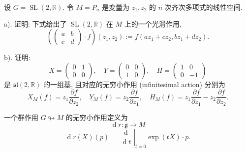 \documentclass[../main.tex]{subfiles}
\begin{document}
\begin{exercise}{}{}
设 $G=\operatorname{SL}(2,\mathbb{R})$. 令 $M=P_n$ 是变量为 $z_1,z_2$ 的 $n$ 次齐次多项式的线性空间.

a). 证明: 下式给出了 $\operatorname{SL}(2,\mathbb{R})$ 在 $M$ 上的一个光滑作用,
\[
\left(
\begin{pmatrix}
a & b\\
c & d
\end{pmatrix}
\cdot f
\right)(z_1,z_2):=f(az_1+cz_2,bz_1+dz_2).
\]

b). 证明:
\[
X=
\begin{pmatrix}
0 & 1\\
0 & 0
\end{pmatrix},\quad
Y=
\begin{pmatrix}
0 & 0\\
1 & 0
\end{pmatrix},\quad
H=
\begin{pmatrix}
1 & 0\\
0 & -1
\end{pmatrix}
\]
是 $\mathfrak{sl}(2,\mathbb{R})$ 的一组基, 且对应的无穷小作用 (infinitesimal action) 分别为
\[
X_M(f)=z_1\frac{\partial f}{\partial z_2},\quad
Y_M(f)=z_2\frac{\partial f}{\partial z_1},\quad
H_M(f)=z_1\frac{\partial f}{\partial z_1}-z_2\frac{\partial f}{\partial z_2}.
\]

一个群作用 $G\looparrowright M$ 的无穷小作用定义为
\[
\operatorname{d}r:\mathfrak{g}\to M
\]
\[
\operatorname{d}r(X)(p)=\left.\frac{\operatorname{d}}{\operatorname{d}t}\right|_{t=0}\exp(tX)\cdot p.
\]
\end{exercise}
\end{document}
